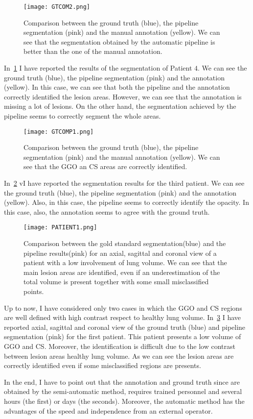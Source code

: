 \documentclass{standalone}
\begin{document}
 	
 	\begin{figure}[h!]
 		\texttt{[image: GTCOM2.png]}
 		
 		\caption{Comparison between the ground truth (blue), the pipeline segmentation (pink) and the manual annotation (yellow). We can see that the segmentation obtained by the automatic pipeline is better than the one of the manual annotation.}\label{fig:conf2}
 	\end{figure}
	In \figurename\,\ref{fig:conf2} I have reported the results of the segmentation of Patient $4$. We can see the ground truth (blue), the pipeline segmentation (pink) and the annotation (yellow). In this case, we can see that both the pipeline and the annotation correctly identified the lesion areas. However, we can see that the annotation is missing a lot of lesions. On the other hand, the segmentation achieved by the pipeline seems to correctly segment the whole areas. 
 	\begin{figure}[h!]
 		\texttt{[image: GTCOMP1.png]}
 		
 		\caption{Comparison between the ground truth (blue), the pipeline segmentation (pink) and the manual annotation (yellow). We can see that the GGO an CS areas are correctly identified.}\label{fig:conf1}
 	\end{figure}
 
	In \figurename\,\ref{fig:conf1} vI have reported the segmentation results for the third patient. We can see the ground truth (blue), the pipeline segmentation (pink) and the annotation (yellow). Also, in this case, the pipeline seems to correctly identify the opacity. In this case, also, the annotation seems to agree with the ground truth.
	
 	\begin{figure}[h!]
 		\centering
 		\texttt{[image: PATIENT1.png]}  
 		\caption{Comparison between the gold standard segmentation(blue) and the pipeline results(pink) for an axial, sagittal and coronal view of a patient with a low involvement of lung volume. We can see that the main lesion areas are identified, even if an underestimation of the total volume is present together with some small misclassified points.}\label{fig:pat1}
 	\end{figure}
 	
 
 	Up to now, I have considered only two cases in which the GGO and CS regions are well defined with high contrast respect to healthy lung volume. In \figurename\,\ref{fig:pat1} I have reported axial, sagittal and coronal view of the ground truth (blue) and pipeline segmentation (pink) for the first patient. This patient presents a low volume of GGO and CS. Moreover, the identification is difficult due to the low contrast between lesion areas healthy lung volume. As we can see the lesion areas are correctly identified even if some misclassified regions are presents. 
 	
 	In the end, I have to point out that the annotation and ground truth since are obtained by the semi-automatic method, requires trained personnel and several hours (the first) or days (the seconds). Moreover, the automatic method has the advantages of the speed and independence from an external operator.
	
\end{document}
